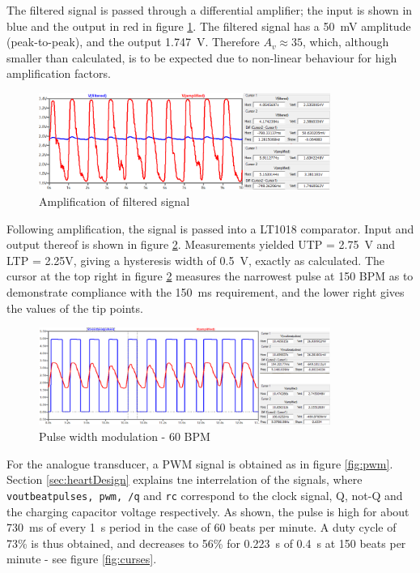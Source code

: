 The filtered signal is passed through a differential amplifier; the input is shown in blue and the output in red in figure \ref{fig:amplified}. The filtered signal has a \SI{50}{mV} amplitude (peak-to-peak), and the output \SI{1.747}{V}. Therefore $A_v \approx 35$, which, although smaller than calculated, is to be expected due to non-linear behaviour for high amplification factors. 
\begin{figure}
\centering
\includegraphics[width=0.85\textwidth]{./Figures/amplified}
\caption{Amplification of filtered signal}
\label{fig:amplified}
\end{figure}

Following amplification, the signal is passed into a LT1018 comparator. Input and output thereof is shown in figure \ref{fig:pulses}. Measurements yielded UTP = \SI{2.75}{V} and LTP = {2.25}{V}, giving a hysteresis width of \SI{0.5}{V}, exactly as calculated. The cursor at the top right in figure \ref{fig:pulses} measures the narrowest pulse at 150 BPM as to demonstrate compliance with the \SI{150}{ms} requirement, and the lower right gives the values of the tip points.

\begin{figure}
\centering
\includegraphics[width=0.85\textwidth]{./Figures/pulses}
\caption{Pulse width modulation - 60 BPM}
\label{fig:pulses}
\end{figure}

For the analogue transducer, a PWM signal is obtained as in figure \ref{fig:pwm}. Section \ref{sec:heartDesign} explains tne interrelation of the signals, where \texttt{voutbeatpulses, pwm, /q} and \texttt{rc} correspond to the clock signal, Q, not-Q and the charging capacitor voltage respectively. As shown, the pulse is high for about \SI{730}{ms} of every \SI{1}{s} period in the case of 60 beats per minute. A duty cycle of 73\% is thus obtained, and decreases to 56\% for \SI{0.223}{s} of \SI{0.4}{s} at 150 beats per minute - see figure \ref{fig:curses}.

